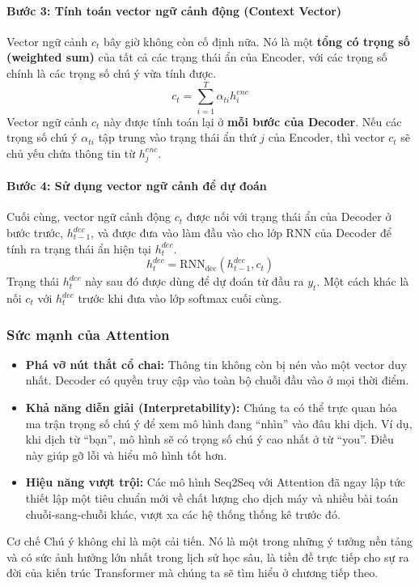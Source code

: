 \paragraph{Bước 3: Tính toán vector ngữ cảnh động (Context Vector)}
Vector ngữ cảnh $c_t$ bây giờ không còn cố định nữa. Nó là một \textbf{tổng có trọng số (weighted sum)} của tất cả các trạng thái ẩn của Encoder, với các trọng số chính là các trọng số chú ý vừa tính được.
$$ c_t = \sum_{i=1}^{T} \alpha_{ti} h_i^{enc} $$
Vector ngữ cảnh $c_t$ này được tính toán lại ở \textbf{mỗi bước của Decoder}. Nếu các trọng số chú ý $\alpha_{ti}$ tập trung vào trạng thái ẩn thứ $j$ của Encoder, thì vector $c_t$ sẽ chủ yếu chứa thông tin từ $h_j^{enc}$.

\paragraph{Bước 4: Sử dụng vector ngữ cảnh để dự đoán}
Cuối cùng, vector ngữ cảnh động $c_t$ được nối với trạng thái ẩn của Decoder ở bước trước, $h_{t-1}^{dec}$, và được đưa vào làm đầu vào cho lớp RNN của Decoder để tính ra trạng thái ẩn hiện tại $h_t^{dec}$.
$$ h_t^{dec} = \text{RNN}_{\text{dec}}(h_{t-1}^{dec}, c_t) $$
Trạng thái $h_t^{dec}$ này sau đó được dùng để dự đoán từ đầu ra $y_t$. Một cách khác là nối $c_t$ với $h_t^{dec}$ trước khi đưa vào lớp softmax cuối cùng.

\subsubsection{Sức mạnh của Attention}
\begin{itemize}
    \item \textbf{Phá vỡ nút thắt cổ chai:} Thông tin không còn bị nén vào một vector duy nhất. Decoder có quyền truy cập vào toàn bộ chuỗi đầu vào ở mọi thời điểm.
    \item \textbf{Khả năng diễn giải (Interpretability):} Chúng ta có thể trực quan hóa ma trận trọng số chú ý để xem mô hình đang “nhìn” vào đâu khi dịch. Ví dụ, khi dịch từ “bạn”, mô hình sẽ có trọng số chú ý cao nhất ở từ “you”. Điều này giúp gỡ lỗi và hiểu mô hình tốt hơn.
    \item \textbf{Hiệu năng vượt trội:} Các mô hình Seq2Seq với Attention đã ngay lập tức thiết lập một tiêu chuẩn mới về chất lượng cho dịch máy và nhiều bài toán chuỗi-sang-chuỗi khác, vượt xa các hệ thống thống kê trước đó.
\end{itemize}

Cơ chế Chú ý không chỉ là một cải tiến. Nó là một trong những ý tưởng nền tảng và có sức ảnh hưởng lớn nhất trong lịch sử học sâu, là tiền đề trực tiếp cho sự ra đời của kiến trúc Transformer mà chúng ta sẽ tìm hiểu ở chương tiếp theo.